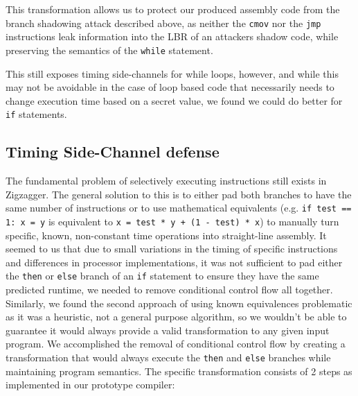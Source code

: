 \documentclass[sigplan, review]{acmart}
\begin{document}
This transformation allows us to protect our produced assembly code from the branch shadowing attack described above, as neither the \texttt{cmov} nor the \texttt{jmp} instructions leak information into the LBR of an attackers shadow code, while preserving the semantics of the \texttt{while} statement.

This still exposes timing side-channels for while loops, however, and while this may not be avoidable in the case of loop based code that necessarily needs to change execution time based on a secret value, we found we could do better for \texttt{if} statements.

\subsection{Timing Side-Channel defense}
The fundamental problem of selectively executing instructions still exists in Zigzagger. The general solution to this is to either pad both branches to have the same number of instructions or to use mathematical equivalents (e.g. \texttt{if test == 1: x = y} is equivalent to \texttt{x = test * y + (1 - test) * x}) to manually turn specific, known, non-constant time operations into straight-line assembly. It seemed to us that due to small variations in the timing of specific instructions and differences in processor implementations, it was not sufficient to pad either the \texttt{then} or \texttt{else} branch of an \texttt{if} statement to ensure they have the same predicted runtime, we needed to remove conditional control flow all together. Similarly, we found the second approach of using known equivalences problematic as it was a heuristic, not a general purpose algorithm, so we wouldn't be able to guarantee it would always provide a valid transformation to any given input program. We accomplished the removal of conditional control flow by creating a transformation that would always execute the \texttt{then} and \texttt{else} branches while maintaining program semantics. The specific transformation consists of 2 steps as implemented in our prototype compiler:
\end{document}
